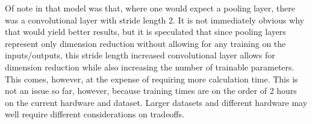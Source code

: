 \documentclass[a4paper,fleqn,usenatbib]{mnras}
\begin{document}
Of note in that model was that, where one would expect a pooling layer, there was a convolutional layer with stride length 2. It is not immediately obvious why that would yield better results, but it is speculated that since pooling layers represent only dimension reduction without allowing for any training on the inputs/outputs, this stride length increased convolutional layer allows for dimension reduction while also increasing the number of trainable parameters. This comes, however, at the expense of requiring more calculation time. This is not an issue so far, however, because training times are on the order of 2 hours on the current hardware and dataset. Larger datasets and different hardware may well require different considerations on tradeoffs. 

 \begin{figure}


\end{figure}
\end{document}
